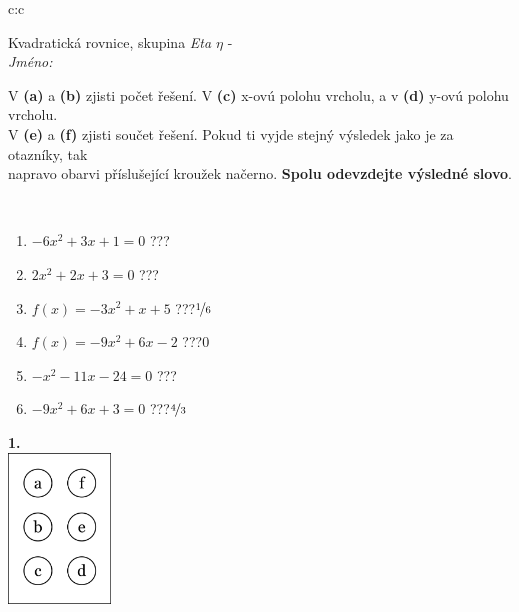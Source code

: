 \documentclass[10pt]{report}
\begin{document}
\begin{tabular}{c:c}
\begin{minipage}[c][104.5mm][t]{0.5\linewidth}
\begin{center}
\vspace{7mm}
{\huge Kvadratická rovnice, skupina \textit{Eta $\eta$} -}\\[5mm]
\textit{Jméno:}\phantom{xxxxxxxxxxxxxxxxxxxxxxxxxxxxxxxxxxxxxxxxxxxxxxxxxxxxxxxxxxxxxxxxx}\\[5mm]
\begin{minipage}{0.95\linewidth}
\begin{center}
V \textbf{(a)} a \textbf{(b)} zjisti počet řešení. V \textbf{(c)} x-ovú polohu vrcholu, a v \textbf{(d)} y-ovú polohu vrcholu.\\V \textbf{(e)} a \textbf{(f)} zjisti součet řešení. Pokud ti vyjde stejný výsledek jako je za otazníky, tak\\napravo obarvi příslušející kroužek načerno. \textbf{Spolu odevzdejte výsledné slovo}.
\end{center}
\end{minipage}
\\[1mm]
\begin{minipage}{0.79\linewidth}
\begin{center}
\begin{varwidth}{\linewidth}
\begin{enumerate}
\Large
\item $-6x^2+3x+1=0$\quad \dotfill\; ???\;\dotfill {}
\item $2x^2+2x+3=0$\quad \dotfill\; ???\;\dotfill {}
\item $f(x)=-3x^2+x+5$\quad \dotfill\; ???\;\dotfill \quad $\nicefrac{1}{6}$
\item $f(x)=-9x^2+6x-2$\quad \dotfill\; ???\;\dotfill \quad $0$
\item $-x^2-11x-24=0$\quad \dotfill\; ???\;\dotfill {}
\item $-9x^2+6x+3=0$\quad \dotfill\; ???\;\dotfill \quad $\nicefrac{4}{3}$
\end{enumerate}
\end{varwidth}
\end{center}
\end{minipage}
\begin{minipage}{0.20\linewidth}
\begin{center}
{\Huge\bfseries 1.} \\[2mm]
\includegraphics[height=40mm]{../images/braille.png}

\end{center}
\end{minipage}
\end{center}
\end{minipage}
\end{tabular}
\end{document}
